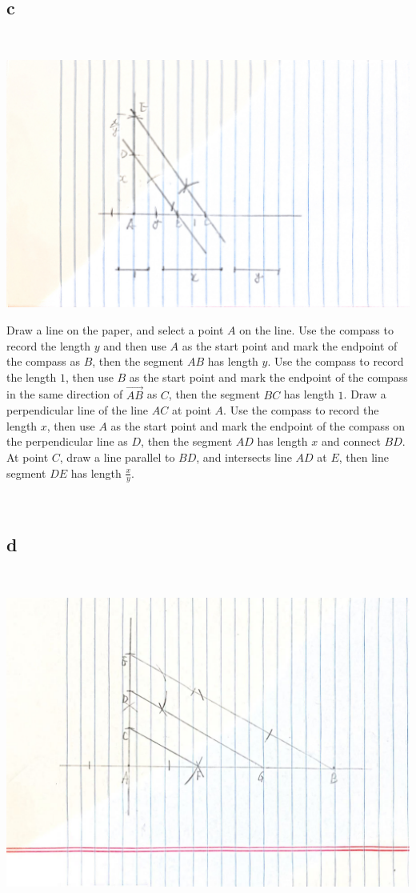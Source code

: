 \documentclass{article}
\begin{document}
~

\subsection*{c}

~

\includegraphics[scale=0.05]{HW_0214/2c_1.jpg}

Draw a line on the paper, and select a point $A$ on the line. Use the compass to record the length $y$ and then use $A$ as the start point and mark the endpoint of the compass as $B$, then the segment $AB$ has length $y$. Use the compass to record the length $1$, then use $B$ as the start point and mark the endpoint of the compass in the same direction of $\overrightarrow{AB}$ as $C$, then the segment $BC$ has length $1$. Draw a perpendicular line of the line $AC$ at point $A$. Use the compass to record the length $x$, then use $A$ as the start point and mark the endpoint of the compass on the perpendicular line as $D$, then the segment $AD$ has length $x$ and connect $BD$. At point $C$, draw a line parallel to $BD$, and intersects line $AD$ at $E$, then line segment $DE$ has length $\frac{x}{y}$.

~

\subsection*{d}

~

\includegraphics[scale=0.1]{HW_0214/2dre.jpg}
\end{document}

